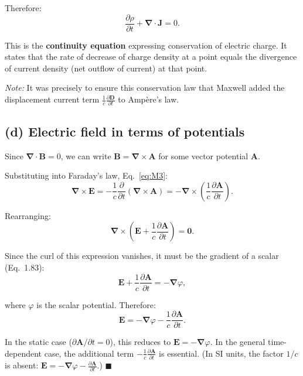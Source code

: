 \documentclass[12pt]{article}
\newcommand{\vect}[1]{\mathbf{#1}}
\newcommand{\grad}{\boldsymbol{\nabla}}
\newcommand{\curl}{\grad\times}
\newcommand{\divr}{\grad\cdot}
\begin{document}
Therefore:
\[
\boxed{\frac{\partial\rho}{\partial t} + \divr\vect{J} = 0}.
\]

This is the \textbf{continuity equation} expressing conservation of electric charge. It states that the rate of decrease of charge density at a point equals the divergence of current density (net outflow of current) at that point.

\textit{Note:} It was precisely to ensure this conservation law that Maxwell added the displacement current term $\frac{1}{c}\frac{\partial\vect{D}}{\partial t}$ to Amp\`ere's law.

\subsection*{(d) Electric field in terms of potentials}

Since $\divr\vect{B} = 0$, we can write $\vect{B} = \curl\vect{A}$ for some vector potential $\vect{A}$.

Substituting into Faraday's law, Eq.~\eqref{eq:M3}:
\[
\curl\vect{E} = -\frac{1}{c}\frac{\partial}{\partial t}(\curl\vect{A}) = -\curl\!\left(\frac{1}{c}\frac{\partial\vect{A}}{\partial t}\right).
\]

Rearranging:
\[
\curl\!\left(\vect{E} + \frac{1}{c}\frac{\partial\vect{A}}{\partial t}\right) = \vect{0}.
\]

Since the curl of this expression vanishes, it must be the gradient of a scalar (Eq.~1.83):
\[
\vect{E} + \frac{1}{c}\frac{\partial\vect{A}}{\partial t} = -\grad\varphi,
\]

where $\varphi$ is the scalar potential. Therefore:
\[
\boxed{\vect{E} = -\grad\varphi - \frac{1}{c}\frac{\partial\vect{A}}{\partial t}}.
\]

In the static case ($\partial\vect{A}/\partial t = 0$), this reduces to $\vect{E} = -\grad\varphi$. In the general time-dependent case, the additional term $-\frac{1}{c}\frac{\partial\vect{A}}{\partial t}$ is essential. (In SI units, the factor $1/c$ is absent: $\vect{E} = -\grad\varphi - \frac{\partial\vect{A}}{\partial t}$.) \hfill $\blacksquare$
\end{document}
